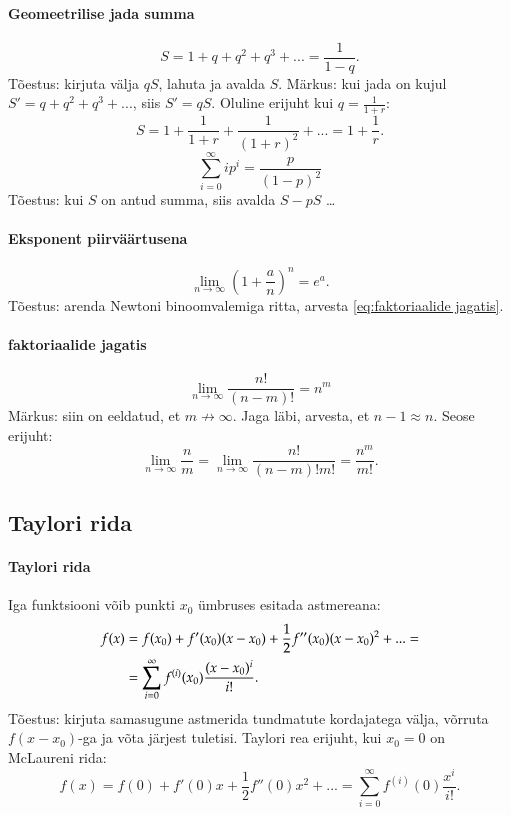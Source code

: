 \documentclass[a4paper]{article}
\numberwithin{equation}{subsection}
\begin{document}
\paragraph{Geomeetrilise jada summa}
\begin{equation}
S=1+q+q^2+q^3+... = \frac{1 }{ 1-q}.
\end{equation}
Tõestus: kirjuta välja $qS$, lahuta ja avalda $S$. Märkus: kui jada on
kujul $S'=q+q^2+q^3+...$, siis $S'=qS$. Oluline erijuht kui $q=\frac{1 }{
1+r}$:
\begin{equation}
 S = 1 + \frac{1 }{ 1+r} + \frac{1 }{ (1+r)^2} + ... = 1 + \frac{1 }{ r}.
\end{equation}
\begin{equation}
  \sum_{i=0}^\infty i p^i = \frac{p}{(1 - p)^2}
\end{equation}
Tõestus: kui $S$ on antud summa, siis avalda $S - pS$ \ldots

\paragraph{Eksponent piirväärtusena}
\begin{equation}
 \lim_{n\to\infty} \left( 1 + \frac{a}{ n} \right)^n = e^a.
\end{equation}
Tõestus: arenda Newtoni binoomvalemiga ritta, arvesta
\eqref{eq:faktoriaalide jagatis}.

\paragraph{faktoriaalide jagatis}
\begin{equation}
\lim_{n\to\infty} \frac{n! }{ (n-m)!} = n^m
\label{eq:faktoriaalide jagatis}
\end{equation}
Märkus: siin on eeldatud, et $m \not\to \infty$. Jaga läbi, arvesta, et
$n-1 \approx n$. Seose erijuht:
\begin{equation}
 \lim_{n\to\infty} \frac{n}{m} = \lim_{n\to\infty} \frac{n! }{ (n-m)! m!}
= \frac{n^m }{ m!}.
\end{equation}


\subsection{Taylori rida}

\paragraph{Taylori rida}
Iga funktsiooni võib punkti $x_0$ ümbruses esitada astmereana:
\begin{align}
f(x) & =f(x_0) + f'(x_0)(x-x_0) + \frac{1}{ 2}f''(x_0)(x-x_0)^2 +
  ... = \notag\\
  & =\sum^\infty_{i=0} f^{(i)}(x_0) \frac{(x-x_0)^i }{ i!}.
\end{align}
Tõestus: kirjuta samasugune
astmerida tundmatute kordajatega välja, võrruta $f(x-x_0)$-ga ja võta
järjest tuletisi. Taylori rea erijuht, kui $x_0=0$ on McLaureni rida:
\begin{equation}
f(x) =f(0) + f'(0)x + \frac{1}{ 2} f''(0)x^2 + ...
  = \sum^\infty_{i=0} f^{(i)}(0) \frac{x^i }{ i!}.
\end{equation}
\end{document}
